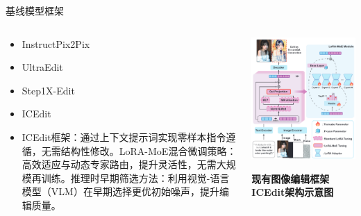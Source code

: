 \documentclass[11pt,aspectratio=169]{beamer}
\begin{document}
\begin{frame}{基线模型框架}
    \begin{columns}
        \begin{column}{0.4\textwidth}
            {\tiny
            \begin{itemize}
                \item InstructPix2Pix~\cite{Brooks_2023_CVPR}
                \item UltraEdit~\cite{zhaoUltraEditInstructionbasedFineGrained2024b}
                \item Step1X-Edit~\cite{liuStep1XEditPracticalFramework2025}
                \item ICEdit~\cite{zhangInContextEditEnabling2025}
                \item ICEdit框架：通过上下文提示词实现零样本指令遵循，无需结构性修改。LoRA-MoE混合微调策略：高效适应与动态专家路由，提升灵活性，无需大规模再训练。推理时早期筛选方法：利用视觉-语言模型（VLM）在早期选择更优初始噪声，提升编辑质量。
            \end{itemize}
            }
        \end{column}
        \begin{column}{0.6\textwidth}
            \centering
            \includegraphics[width=0.65\linewidth]{imagens/icedit_framework.png}

            {\tiny \textbf{现有图像编辑框架ICEdit架构示意图~\cite{zhangInContextEditEnabling2025}}}
        \end{column}
    \end{columns}
\end{frame}
\end{document}
